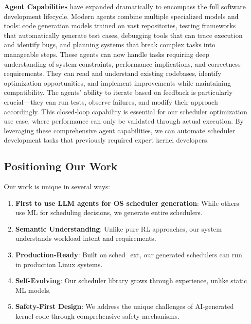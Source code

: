 \textbf{Agent Capabilities} have expanded dramatically to encompass the full software development lifecycle. Modern agents combine multiple specialized models and tools: code generation models trained on vast repositories, testing frameworks that automatically generate test cases, debugging tools that can trace execution and identify bugs, and planning systems that break complex tasks into manageable steps. These agents can now handle tasks requiring deep understanding of system constraints, performance implications, and correctness requirements. They can read and understand existing codebases, identify optimization opportunities, and implement improvements while maintaining compatibility. The agents' ability to iterate based on feedback is particularly crucial—they can run tests, observe failures, and modify their approach accordingly. This closed-loop capability is essential for our scheduler optimization use case, where performance can only be validated through actual execution. By leveraging these comprehensive agent capabilities, we can automate scheduler development tasks that previously required expert kernel developers.

\subsection{Positioning Our Work}

Our work is unique in several ways:

\begin{enumerate}
\item \textbf{First to use LLM agents for OS scheduler generation}: While others use ML for scheduling decisions, we generate entire schedulers.

\item \textbf{Semantic Understanding}: Unlike pure RL approaches, our system understands workload intent and requirements.

\item \textbf{Production-Ready}: Built on sched\_ext, our generated schedulers can run in production Linux systems.

\item \textbf{Self-Evolving}: Our scheduler library grows through experience, unlike static ML models.

\item \textbf{Safety-First Design}: We address the unique challenges of AI-generated kernel code through comprehensive safety mechanisms.
\end{enumerate}

